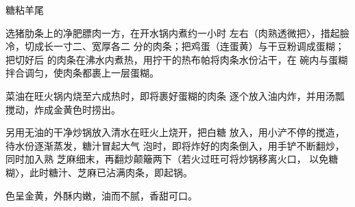 \begin{recipe}{糖粘羊尾}

\ingredients



\cooking

\step 	选猪肋条上的净肥膘肉一方，在开水锅内煮约一小时 左右（肉熟透微把〉，措起臉冷，切成长一寸二、宽厚各二 分的肉条；把鸡蛋（连蛋黄）与干豆粉调成蛋糊；把切好后 的肉条在沸水内煮热，用拧干的热布帕将肉条水份沾干，在 碗内与蛋糊拌合调匀，使肉条都裹上一层蛋糊。

\step 	菜油在旺火锅内烧至六成热时，即将裹好蛋糊的肉条 逐个放入油内炸，并用汤瓢搅动，炸成金黄色时捞出。

\step 	另用无油的干净炒锅放入清水在旺火上烧开，把白糖 放入，用小浐不停的搅造，待水份逐渐蒸发，糖汁冒起大气 泡时，即将炸好的肉条倒入，用手铲不断翻炒，同时加入熟 芝麻细末，再翻炒颠簸两下（若火过旺可将炒锅移离火口， 以免糖糊〉，此时糖汁、芝麻已沾满肉条，即起锅。

\notes

色呈金黄，外酥内嫩，油而不腻，香甜可口。

\end{recipe}

